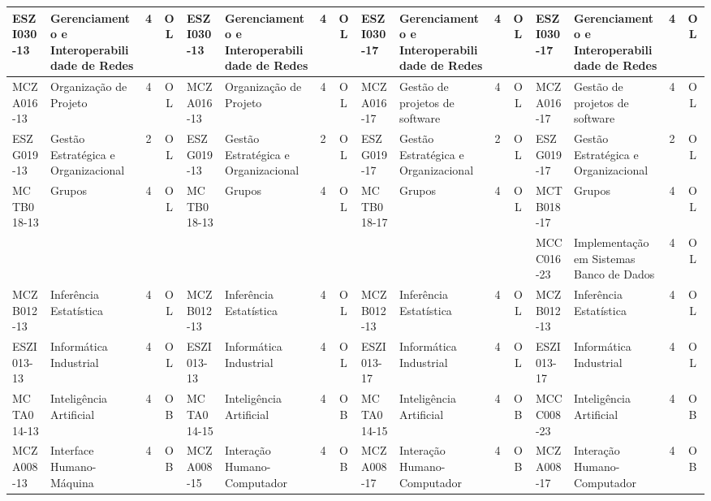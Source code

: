 \documentclass[a4paper]{article}
\begin{document}
\begin{landscape}
{\begin{longtable}{|l|p{.15\textheight}|c|c||l|p{.15\textheight}|c|c||l|p{.15\textheight}|c|c||l|p{.15\textheight}|c|c|}
    ESZI030-13 & Gerenciamento e Interoperabilidade de Redes & 4 & OL &
    ESZI030-13 & Gerenciamento e Interoperabilidade de Redes & 4 & OL &
    ESZI030-17 & Gerenciamento e Interoperabilidade de Redes & 4 & OL &
    ESZI030-17 & Gerenciamento e Interoperabilidade de Redes & 4 & OL \\ \hline

    MCZA016-13 & Organização de Projeto & 4 & OL &
    MCZA016-13 & Organização de Projeto & 4 & OL &
    MCZA016-17 & Gestão de projetos de software & 4 & OL & 
    MCZA016-17 & Gestão de projetos de software & 4 & OL \\ \hline

    ESZG019-13 & Gestão Estratégica e Organizacional & 2 & OL &
    ESZG019-13 & Gestão Estratégica e Organizacional & 2 & OL &
    ESZG019-17 & Gestão Estratégica e Organizacional & 2 & OL &
    ESZG019-17 & Gestão Estratégica e Organizacional & 2 & OL \\ \hline

    MCTB018-13 & Grupos & 4 & OL &
    MCTB018-13 & Grupos & 4 & OL &
    MCTB018-17 & Grupos & 4 & OL &
    MCTB018-17 & Grupos & 4 & OL \\ \hline

    &  & & &
    &  & & &
    &  & & &
    MCCC016-23 & Implementação em Sistemas Banco de Dados & 4 & OL \\ \hline

    MCZB012-13 & Inferência Estatística & 4 & OL &
    MCZB012-13 & Inferência Estatística & 4 & OL &
    MCZB012-13 & Inferência Estatística & 4 & OL &
    MCZB012-13 & Inferência Estatística & 4 & OL \\ \hline

    ESZI013-13 & Informática Industrial & 4 & OL &
    ESZI013-13 & Informática Industrial & 4 & OL &
    ESZI013-17 & Informática Industrial & 4 & OL & 
    ESZI013-17 & Informática Industrial & 4 & OL \\ \hline

    MCTA014-13 & Inteligência Artificial & 4 & OB &
    MCTA014-15 & Inteligência Artificial & 4 & OB &
    MCTA014-15 & Inteligência Artificial & 4 & OB &
    MCCC008-23 & Inteligência Artificial & 4 & OB \\ \hline

    MCZA008-13 & Interface Humano-Máquina    & 4 & OB &
    MCZA008-15 & Interação Humano-Computador & 4 & OB &
    MCZA008-17 & Interação Humano-Computador & 4 & OB &
    MCZA008-17 & Interação Humano-Computador & 4 & OB \\ \hline



\end{longtable}}
\end{landscape}
\end{document}
